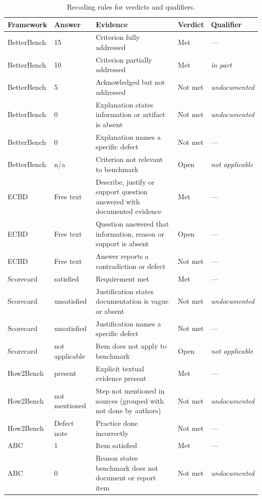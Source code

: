 \documentclass[10pt,conference]{IEEEtran}
\begin{document}
\begin{table}[t]
\caption{Recoding rules for verdicts and qualifiers.}
\label{tab:recoding}
\centering
\small
\begin{tabularx}{\textwidth}{@{}llXll@{}}
\toprule
\textbf{Framework} & \textbf{Answer} & \textbf{Evidence} & \textbf{Verdict} & \textbf{Qualifier} \\
\midrule
BetterBench & 15 & Criterion fully addressed & Met & --- \\
BetterBench & 10 & Criterion partially addressed & Met & \emph{in part} \\
BetterBench & 5 & Acknowledged but not addressed & Not met & \emph{undocumented} \\
BetterBench & 0 & Explanation states information or artifact is absent & Not met & \emph{undocumented} \\
BetterBench & 0 & Explanation names a specific defect & Not met & --- \\
BetterBench & n/a & Criterion not relevant to benchmark & Open & \emph{not applicable} \\
\midrule
ECBD & Free text & Describe, justify or support question answered with documented evidence & Met & --- \\
ECBD & Free text & Question answered that information, reason or support is absent & Open & --- \\
ECBD & Free text & Answer reports a contradiction or defect & Not met & --- \\
\midrule
Scorecard & satisfied & Requirement met & Met & --- \\
Scorecard & unsatisfied & Justification states documentation is vague or absent & Not met & \emph{undocumented} \\
Scorecard & unsatisfied & Justification names a specific defect & Not met & --- \\
Scorecard & not applicable & Item does not apply to benchmark & Open & \emph{not applicable} \\
\midrule
How2Bench & present & Explicit textual evidence present & Met & --- \\
How2Bench & not mentioned & Step not mentioned in sources (grouped with not done by authors) & Not met & \emph{undocumented} \\
How2Bench & Defect note & Practice done incorrectly & Not met & --- \\
\midrule
ABC & 1 & Item satisfied & Met & --- \\
ABC & 0 & Reason states benchmark does not document or report item & Not met & \emph{undocumented} \\

\end{tabularx}
\end{table}
\end{document}
